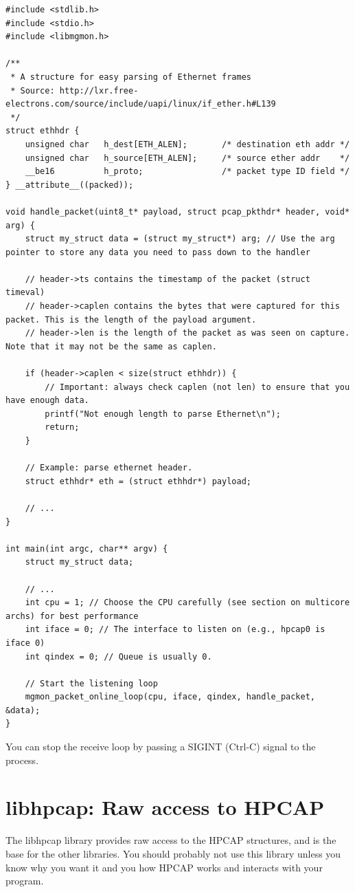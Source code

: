 \documentclass[a4paper,oneside]{hpman}
\begin{document}
\begin{verbatim}
#include <stdlib.h>
#include <stdio.h>
#include <libmgmon.h>

/**
 * A structure for easy parsing of Ethernet frames
 * Source: http://lxr.free-electrons.com/source/include/uapi/linux/if_ether.h#L139
 */
struct ethhdr {
    unsigned char   h_dest[ETH_ALEN];       /* destination eth addr */
    unsigned char   h_source[ETH_ALEN];     /* source ether addr    */
    __be16          h_proto;                /* packet type ID field */
} __attribute__((packed));

void handle_packet(uint8_t* payload, struct pcap_pkthdr* header, void* arg) {
    struct my_struct data = (struct my_struct*) arg; // Use the arg pointer to store any data you need to pass down to the handler

    // header->ts contains the timestamp of the packet (struct timeval)
    // header->caplen contains the bytes that were captured for this packet. This is the length of the payload argument.
    // header->len is the length of the packet as was seen on capture. Note that it may not be the same as caplen.

    if (header->caplen < size(struct ethhdr)) {
        // Important: always check caplen (not len) to ensure that you have enough data.
        printf("Not enough length to parse Ethernet\n");
        return;
    }

    // Example: parse ethernet header.
    struct ethhdr* eth = (struct ethhdr*) payload;

    // ...
}

int main(int argc, char** argv) {
    struct my_struct data;

    // ...
    int cpu = 1; // Choose the CPU carefully (see section on multicore archs) for best performance
    int iface = 0; // The interface to listen on (e.g., hpcap0 is iface 0)
    int qindex = 0; // Queue is usually 0.

    // Start the listening loop
    mgmon_packet_online_loop(cpu, iface, qindex, handle_packet, &data);
}
\end{verbatim}

You can stop the receive loop by passing a SIGINT (Ctrl-C) signal to the process.

\section{libhpcap: Raw access to HPCAP}

The libhpcap library provides raw access to the HPCAP structures, and is the base for the other libraries. You should probably not use this library unless you know why you want it and you how HPCAP works and interacts with your program.
\end{document}
